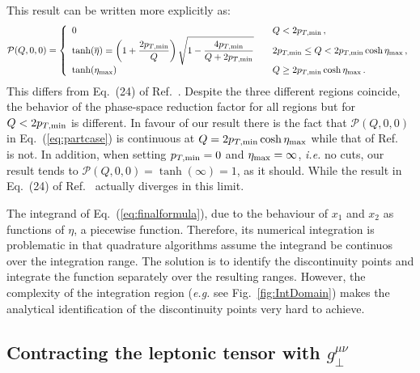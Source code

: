 \documentclass[10pt,a4paper]{article}
\begin{document}
This result can be written more explicitly as:
\begin{equation}\label{eq:partcase}
\mathcal{P}(Q,0,0) = 
\left\{
\begin{array}{ll}
0 & \quad Q< 2p_{T,\rm min}\,,\\
\displaystyle \tanh(\overline{\eta})=\left(1+\frac{2p_{T,\rm min}}{Q}\right)\sqrt{1-\frac{4 p_{T,\rm min}}{Q+2p_{T,\rm min}}}& \quad 2p_{T,\rm min} \leq Q < 2p_{T,\rm min}\cosh\eta_{\rm max}\,,\\
\tanh(\eta_{\rm max}) & \quad Q \geq 2p_{T,\rm min}\cosh\eta_{\rm max}\,.
\end{array}
\right.
\end{equation}
This differs from Eq.~(24) of Ref.~\cite{Scimemi:2017etj}. Despite the
three different regions coincide, the behavior of the phase-space
reduction factor for all regions but for $Q< 2p_{T,\rm min}$ is
different. In favour of our result there is the fact that
$\mathcal{P}(Q,0,0)$ in Eq.~(\ref{eq:partcase}) is continuous at
$Q = 2p_{T,\rm min}\cosh\eta_{\rm max}$ while that of
Ref.~\cite{Scimemi:2017etj} is not. In addition, when setting
$p_{T,\rm min} = 0$ and $\eta_{\rm max}=\infty$, \textit{i.e.} no
cuts, our result tends to $\mathcal{P}(Q,0,0)=\tanh(\infty)=1$, as it
should. While the result in Eq.~(24) of Ref.~\cite{Scimemi:2017etj}
actually diverges in this limit.

The integrand of Eq.~(\ref{eq:finalformula}), due to the behaviour of
$x_1$ and $x_2$ as functions of $\eta$, a piecewise
function. Therefore, its numerical integration is problematic in that
quadrature algorithms assume the integrand be continuos over the
integration range. The solution is to identify the discontinuity
points and integrate the function separately over the resulting
ranges. However, the complexity of the integration region
(\textit{e.g.} see Fig.~\ref{fig:IntDomain}) makes the analytical
identification of the discontinuity points very hard to achieve.

\subsection{Contracting the leptonic tensor with $g_\perp^{\mu\nu}$}
\end{document}
